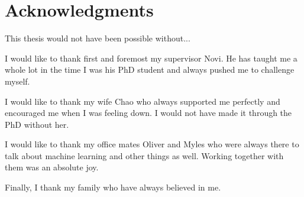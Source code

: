 

\begingroup
\let\clearpage\relax
\let\cleardoublepage\relax
\let\cleardoublepage\relax
\chapter*{Acknowledgments}
This thesis would not have been possible without...

I would like to thank first and foremost my supervisor Novi.
He has taught me a whole lot in the time I was his PhD student and always pushed me to challenge myself.

I would like to thank my wife Chao who always supported me perfectly
and encouraged me when I was feeling down.
I would not have made it through the PhD without her.

I would like to thank my office mates Oliver and Myles
who were always there to talk about machine learning and other things as well.
Working together with them was an absolute joy.

Finally, I thank my family who have always believed in me.

\endgroup
